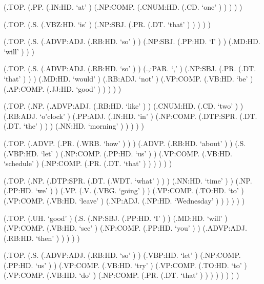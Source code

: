 \documentclass[10pt]{article}
\begin{document}
\begin{parsetree}  (.TOP. (.PP. (.IN:HD. `at' ) (.NP:COMP. (.CNUM:HD. (.CD. `one' ) ) ) ) ) \end{parsetree}

\begin{parsetree}  (.TOP. (.S. (.VBZ:HD. `is' ) (.NP:SBJ. (.PR. (.DT. `that' ) ) ) ) ) \end{parsetree}

\begin{parsetree}  (.TOP. (.S. (.ADVP:ADJ. (.RB:HD. `so' ) ) (.NP:SBJ. (.PP:HD. `I' ) ) (.MD:HD. `will' ) ) ) \end{parsetree}

\begin{parsetree}  (.TOP. (.S. (.ADVP:ADJ. (.RB:HD. `so' ) ) (.,:PAR. `,' ) (.NP:SBJ. (.PR. (.DT. `that' ) ) ) (.MD:HD. `would' ) (.RB:ADJ. `not' ) (.VP:COMP. (.VB:HD. `be' ) (.AP:COMP. (.JJ:HD. `good' ) ) ) ) ) \end{parsetree}

\begin{parsetree}  (.TOP. (.NP. (.ADVP:ADJ. (.RB:HD. `like' ) ) (.CNUM:HD. (.CD. `two' ) ) (.RB:ADJ. `o'clock' ) (.PP:ADJ. (.IN:HD. `in' ) (.NP:COMP. (.DTP:SPR. (.DT. (.DT. `the' ) ) ) (.NN:HD. `morning' ) ) ) ) ) \end{parsetree}

\begin{parsetree}  (.TOP. (.ADVP. (.PR. (.WRB. `how' ) ) ) (.ADVP. (.RB:HD. `about' ) ) (.S. (.VBP:HD. `let' ) (.NP:COMP. (.PP:HD. `us' ) ) (.VP:COMP. (.VB:HD. `schedule' ) (.NP:COMP. (.PR. (.DT. `that' ) ) ) ) ) ) \end{parsetree}

\begin{parsetree}  (.TOP. (.NP. (.DTP:SPR. (.DT. (.WDT. `what' ) ) ) (.NN:HD. `time' ) ) (.NP. (.PP:HD. `we' ) ) (.VP. (.V. (.VBG. `going' ) ) (.VP:COMP. (.TO:HD. `to' ) (.VP:COMP. (.VB:HD. `leave' ) (.NP:ADJ. (.NP:HD. `Wednesday' ) ) ) ) ) ) \end{parsetree}

\begin{parsetree}  (.TOP. (.UH. `good' ) (.S. (.NP:SBJ. (.PP:HD. `I' ) ) (.MD:HD. `will' ) (.VP:COMP. (.VB:HD. `see' ) (.NP:COMP. (.PP:HD. `you' ) ) (.ADVP:ADJ. (.RB:HD. `then' ) ) ) ) ) \end{parsetree}

\begin{parsetree}  (.TOP. (.S. (.ADVP:ADJ. (.RB:HD. `so' ) ) (.VBP:HD. `let' ) (.NP:COMP. (.PP:HD. `us' ) ) (.VP:COMP. (.VB:HD. `try' ) (.VP:COMP. (.TO:HD. `to' ) (.VP:COMP. (.VB:HD. `do' ) (.NP:COMP. (.PR. (.DT. `that' ) ) ) ) ) ) ) ) \end{parsetree}
\end{document}
